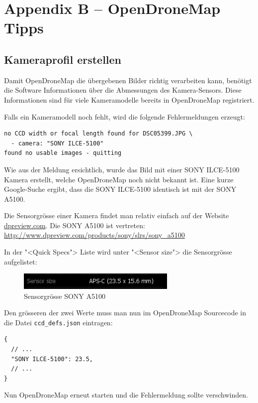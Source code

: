 \chapter{Appendix B -- OpenDroneMap Tipps}

\section{Kameraprofil erstellen}

\label{ch:odm-camera-profile}

Damit OpenDroneMap die übergebenen Bilder richtig verarbeiten kann, benötigt die
Software Informationen über die Abmessungen des Kamera-Sensors. Diese
Informationen sind für viele Kameramodelle bereits in OpenDroneMap registriert.

Falls ein Kameramodell noch fehlt, wird die folgende Fehlermeldungen erzeugt:

\begin{verbatim}
no CCD width or focal length found for DSC05399.JPG \
  - camera: "SONY ILCE-5100"
found no usable images - quitting
\end{verbatim}

Wie aus der Meldung ersichtlich, wurde das Bild mit einer SONY ILCE-5100 Kamera
erstellt, welche OpenDroneMap noch nicht bekannt ist. Eine kurze Google-Suche ergibt,
dass die SONY ILCE-5100 identisch ist mit der SONY A5100.

Die Sensorgrösse einer Kamera findet man relativ einfach auf der Website
\url{dpreview.com}. Die SONY A5100 ist vertreten:
\url{http://www.dpreview.com/products/sony/slrs/sony_a5100}

In der "<Quick Specs"> Liste wird unter "<Sensor size"> die Sensorgrösse
aufgelistet:

\begin{figure}[H]
	\centering
	\includegraphics[width=3in]{images/sensor.png}
	\caption{Sensorgrösse SONY A5100}
\end{figure}

Den grösseren der zwei Werte muss man nun im OpenDroneMap Sourcecode in die
Datei \texttt{ccd\_defs.json} eintragen:

\begin{verbatim} 
{
  // ...
  "SONY ILCE-5100": 23.5,
  // ...
}
\end{verbatim}

Nun OpenDroneMap erneut starten und die Fehlermeldung sollte verschwinden.
